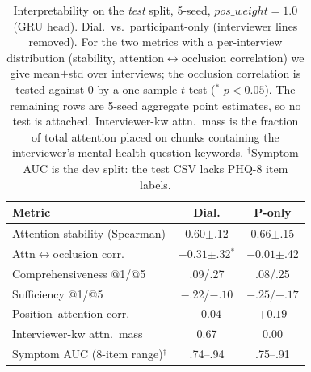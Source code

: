 \documentclass[conference]{IEEEtran}
\begin{document}
\begin{table}[t]
\caption{Interpretability on the \emph{test} split, 5-seed,
$pos\_weight\!=\!1.0$ (GRU head). Dial.\ vs.\
participant-only (interviewer lines removed). For the two metrics with a
per-interview distribution (stability, attention$\leftrightarrow$occlusion
correlation) we give mean$\pm$std over interviews; the occlusion correlation
is tested against 0 by a one-sample $t$-test ($^{*}$ $p<0.05$). The remaining
rows are 5-seed aggregate point estimates, so no test is attached.
Interviewer-kw attn.\ mass is the fraction of total attention placed on chunks
containing the interviewer's mental-health-question keywords.
$^{\dagger}$Symptom AUC is the dev split: the test CSV lacks PHQ-8 item labels.}
\label{tab:interp}
\centering
\small
\setlength{\tabcolsep}{4pt}
\begin{tabular}{@{}p{}cc@{}}
\toprule
\textbf{Metric} & \textbf{Dial.} & \textbf{P-only} \\
\midrule
Attention stability (Spearman) & $0.60${\tiny$\pm$.12} & $0.66${\tiny$\pm$.15} \\
Attn$\leftrightarrow$occlusion corr. & $-0.31${\tiny$\pm$.32}$^{*}$ & $-0.01${\tiny$\pm$.42} \\
Comprehensiveness @1/@5 & .09/.27 & .08/.25 \\
Sufficiency @1/@5 & $-.22$/$-.10$ & $-.25$/$-.17$ \\
Position--attention corr. & $-0.04$ & $+0.19$ \\
Interviewer-kw attn.\ mass & 0.67 & 0.00 \\
Symptom AUC (8-item range)$^{\dagger}$ & .74--.94 & .75--.91 \\
\bottomrule
\end{tabular}
\end{table}
\end{document}
